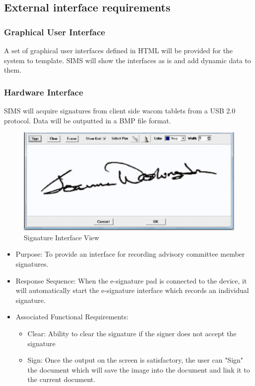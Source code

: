 \documentclass{journal}
\begin{document}
\subsection{External interface requirements}
\subsubsection{Graphical User Interface}
A set of graphical user interfaces defined in HTML will be provided for the system to template. SIMS will show the interfaces as is and add dynamic data to them. 
\subsubsection{Hardware Interface}
SIMS will acquire signatures from client side wacom tablets from a USB 2.0 protocol. Data will be outputted in a BMP file format. 

\begin{figure}[htp]
\centering
\includegraphics[scale=0.75]{diagrams/HTMLTemplating/Figure6.png}
\caption{Signature Interface View}
\label{fig:signature}
\end{figure}

\begin{itemize}
\item Purpose: To provide an interface for recording advisory committee member signatures.
\item Response Sequence: When the e-signature pad is connected to the device, it will automatically start the e-signature interface which records an individual signature.
\item Associated Functional Requirements:
\begin{itemize}
\item Clear: Ability to clear the signature if the signer does not accept the signature
\item Sign: Once the output on the screen is satisfactory, the user can "Sign" the document which will save the image into the document and link it to the current document.
\end{itemize}
\end{itemize}
\end{document}
